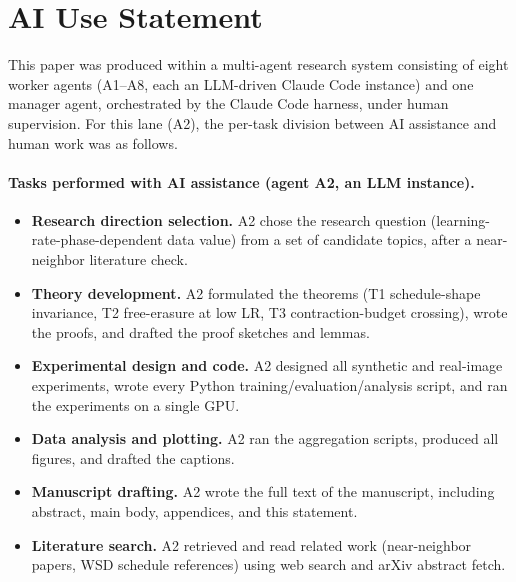 
\section*{AI Use Statement}
\label{sec:ai-use}

This paper was produced within a multi-agent research system consisting of eight
worker agents (A1--A8, each an LLM-driven Claude Code instance) and one manager
agent, orchestrated by the Claude Code harness, under human supervision.
For this lane (A2), the per-task division between AI assistance and human work
was as follows.

\paragraph{Tasks performed with AI assistance (agent A2, an LLM instance).}
\begin{itemize}
  \item \textbf{Research direction selection.} A2 chose the research question
  (learning-rate-phase-dependent data value) from a set of candidate topics,
  after a near-neighbor literature check.
  \item \textbf{Theory development.} A2 formulated the theorems (T1 schedule-shape
  invariance, T2 free-erasure at low LR, T3 contraction-budget crossing),
  wrote the proofs, and drafted the proof sketches and lemmas.
  \item \textbf{Experimental design and code.} A2 designed all synthetic and
  real-image experiments, wrote every Python training/evaluation/analysis
  script, and ran the experiments on a single GPU.
  \item \textbf{Data analysis and plotting.} A2 ran the aggregation scripts,
  produced all figures, and drafted the captions.
  \item \textbf{Manuscript drafting.} A2 wrote the full text of the manuscript,
  including abstract, main body, appendices, and this statement.
  \item \textbf{Literature search.} A2 retrieved and read related work
  (near-neighbor papers, WSD schedule references) using web search and arXiv
  abstract fetch.
\end{itemize}

